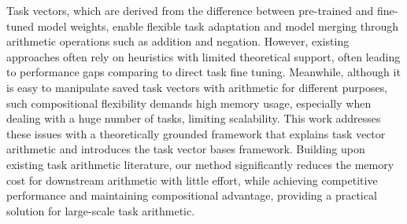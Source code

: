 Task vectors, which are derived from the difference between pre-trained and fine-tuned model weights, enable flexible task adaptation and model merging through arithmetic operations such as addition and negation. However, existing approaches often rely on heuristics with limited theoretical support, often leading to performance gaps comparing to direct task fine tuning. Meanwhile, although it is easy to manipulate saved task vectors with arithmetic for different purposes, such compositional flexibility demands high memory usage, especially when dealing with a huge number of tasks, limiting scalability. This work addresses these issues with a theoretically grounded framework that explains task vector arithmetic and introduces the task vector bases framework. Building upon existing task arithmetic literature, our method significantly reduces the memory cost for downstream arithmetic with little effort, while achieving competitive performance and maintaining compositional advantage, providing a practical solution for large-scale task arithmetic.
